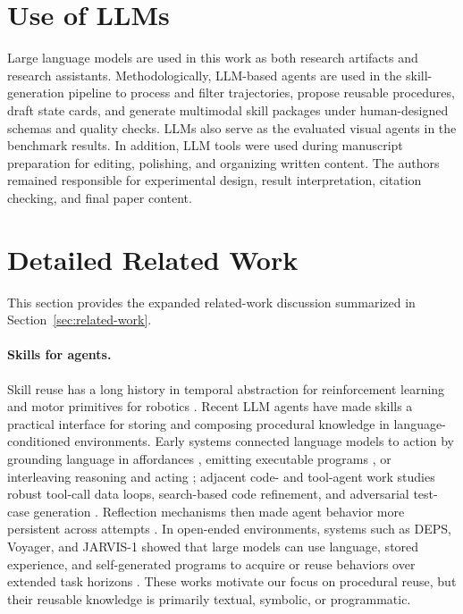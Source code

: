 \documentclass{llmxive}
\begin{document}
\section{Use of LLMs}
\label{app:use-of-llms}

Large language models are used in this work as both research artifacts and research assistants. Methodologically, LLM-based agents are used in the skill-generation pipeline to process and filter trajectories, propose reusable procedures, draft state cards, and generate multimodal skill packages under human-designed schemas and quality checks. LLMs also serve as the evaluated visual agents in the benchmark results. In addition, LLM tools were used during manuscript preparation for editing, polishing, and organizing written content. The authors remained responsible for experimental design, result interpretation, citation checking, and final paper content.



\section{Detailed Related Work}
\label{app:related-work}

This section provides the expanded related-work discussion summarized in Section~\ref{sec:related-work}.

\paragraph{Skills for agents.}
Skill reuse has a long history in temporal abstraction for reinforcement learning and motor primitives for robotics \citep{sutton1999options,ijspeert2013dmp}. Recent LLM agents have made skills a practical interface for storing and composing procedural knowledge in language-conditioned environments. Early systems connected language models to action by grounding language in affordances \citep{ichter2022saycan}, emitting executable programs \citep{liang2023codepolicies}, or interleaving reasoning and acting \citep{yao2023react}; adjacent code- and tool-agent work studies robust tool-call data loops, search-based code refinement, and adversarial test-case generation \citep{zhang2025looptoolclosingdatatrainingloop,li2025rethinkmctsrefiningerroneousthoughts,li2026atgen}. Reflection mechanisms then made agent behavior more persistent across attempts \citep{shinn2023reflexion}. In open-ended environments, systems such as DEPS, Voyager, and JARVIS-1 showed that large models can use language, stored experience, and self-generated programs to acquire or reuse behaviors over extended task horizons \citep{wang2024deps,wang2023voyager,wang2023jarvis}. These works motivate our focus on procedural reuse, but their reusable knowledge is primarily textual, symbolic, or programmatic.
\end{document}
